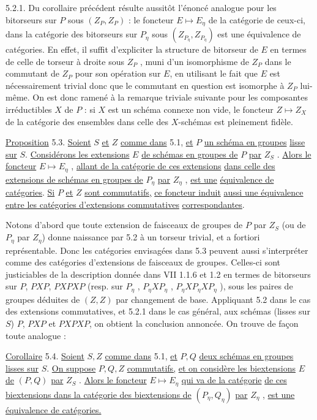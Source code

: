 5.2.1. Du corollaire précédent résulte aussitôt l'énoncé analogue pour les bitorseurs sur $P$ sous $(Z_P,Z_P)$ : le foncteur $E \longmapsto E_\eta$ de la catégorie de ceux-ci, dans la catégorie des bitorseurs sur $P_\eta$ sous $(Z_{P_\eta} ,Z_{P_\eta} )$ est une équivalence de catégories. En effet, il suffit d'expliciter la structure de bitorseur de $E$ en termes de celle de torseur à droite sous $Z_P$ , muni d'un isomorphisme de $Z_P$ dans le commutant de $Z_P$ pour son opération sur $E$, en utilisant le fait que $E$ est nécessairement trivial donc que le commutant en question est isomorphe à $Z_P$ lui-même. On est donc ramené à la remarque triviale suivante pour les composantes irréductibles $X$ de $P$ : si $X$ est un schéma connexe non vide, le foncteur $Z \longmapsto Z_X$ de la catégorie des ensembles dans celle des $X$-schémas est pleinement fidèle.

\underline{Proposition} 5.3. \underline{Soient} $S$ \underline{et} $Z$ \underline{comme dans} 5.1, \underline{et} $P$ \underline{un schéma en groupes} \underline{lisse sur} $S$. \underline{Considérons les extensions} $E$ \underline{de schémas en groupes de} $P$ \underline{par} $Z_S$ . \underline{Alors le foncteur} $E \longmapsto E_\eta$ , \underline{allant de la catégorie de ces extensions} \underline{dans celle des extensions de schémas en groupes de} $P_\eta$ \underline{par} $Z_\eta$ , \underline{est une}
\underline{équivalence de catégories}. \underline{Si} $P$ \underline{et} $Z$ \underline{sont commutatifs,} \underline{ce foncteur induit} \underline{aussi une équivalence entre les catégories d'extensions commutatives} \underline{correspondantes}.

Notons d'abord que toute extension de faisceaux de groupes de $P$ par $Z_S$ (ou de $P_\eta$ par $Z_\eta$) donne naissance par 5.2 à un torseur trivial, et a fortiori représentable. Donc les catégories envisagées dans 5.3 peuvent aussi s'interpréter comme des catégories d'extensions de faisceaux de groupes. Celles-ci sont justiciables de la description donnée dans VII 1.1.6 et 1.2 en termes de bitorseurs sur $P$, $PXP$, $PXPXP$ (resp. sur $P_\eta$ , $P_\eta X P_\eta$ , $P_\eta X P_\eta X P_\eta$ ), sous les paires de groupes déduites de $(Z,Z)$ par changement de base. Appliquant 5.2 dans le cas des extensions commutatives, et 5.2.1 dans le cas général, aux schémas (lisses sur $S$) $P$, $PXP$ et $PXPXP$, on obtient la conclusion annoncée. On trouve de façon toute analogue :

\underline{Corollaire} 5.4. \underline{Soient} $S,Z$ \underline{comme dans} 5.1, \underline{et} $P,Q$ \underline{deux schémas en groupes} \underline{lisses sur} $S$. \underline{On suppose} $P,Q,Z$ \underline{commutatifs,} \underline{et on considère les biextensions} $E$ \underline{de} $(P,Q)$ \underline{par} $Z_S$ . \underline{Alors le foncteur} $E \longmapsto E_\eta$ \underline{qui va de la catégorie} \underline{de ces biextensions dans la catégorie des biextensions de} $(P_\eta,Q_\eta)$ \underline{par} $Z_\eta$ , \underline{est une équivalence de catégories.}


